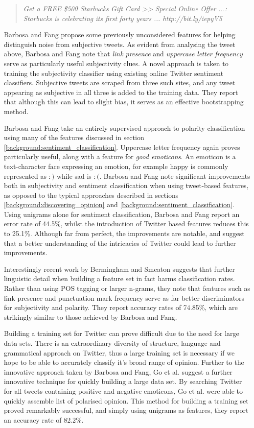 \begin{quote}
	\emph{Get a FREE \$500 Starbucks Gift Card >> Special Online Offer ...: Starbucks is celebrating its first forty years ... http://bit.ly/iepyV5}
\end{quote}

Barbosa and Fang propose some previously unconsidered features for helping distinguish noise from subjective tweets. As evident from analysing the tweet above, Barbosa and Fang note that \emph{link presence} and \emph{uppercase letter frequency} serve as particularly useful subjectivity clues. A novel approach is taken to training the subjectivity classifier using existing online Twitter sentiment classifiers. Subjective tweets are scraped from three such sites, and any tweet appearing as subjective in all three is added to the training data. They report that although this can lead to slight bias, it serves as an effective bootstrapping method. 

Barbosa and Fang take an entirely supervised approach to polarity classification using many of the features discussed in section \ref{background:sentiment_classification}. Uppercase letter frequency again proves particularly useful, along with a feature for \emph{good emoticons}. An emoticon is a text-character face expressing an emotion, for example happy is commonly represented as $:)$ while sad is $:($. Barbosa and Fang note significant improvements both in subjectivity and sentiment classification when using tweet-based features, as opposed to the typical approaches described in sections \ref{background:discovering_opinion} and \ref{background:sentiment_classification}. Using unigrams alone for sentiment classification, Barbosa and Fang report an error rate of 44.5\%, whilst the introduction of Twitter based features reduces this to 25.1\%. Although far from perfect, the improvements are notable, and suggest that a better understanding of the intricacies of Twitter could lead to further improvements.

Interestingly recent work by Bermingham and Smeaton \cite{Bermingham:2010vh} suggests that further linguistic detail when building a feature set in fact harms classification rates. Rather than using POS tagging or larger n-grams, they note that features such as link presence and punctuation mark frequency serve as far better discriminators for subjectivity and polarity. They report accuracy rates of 74.85\%, which are strikingly similar to those achieved by Barbosa and Fang. 

Building a training set for Twitter can prove difficult due to the need for large data sets. There is an extraordinary diversity of structure, language and grammatical approach on Twitter, thus a large training set is necessary if we hope to be able to accurately classify it's broad range of opinion. Further to the innovative approach taken by Barbosa and Fang, Go et al. \cite{Go:2009ut} suggest a further innovative technique for quickly building a large data set. By searching Twitter for all tweets containing positive and negative emoticons, Go et al. were able to quickly assemble list of polarised opinion. This method for building a training set proved remarkably successful, and simply using unigrams as features, they report an accuracy rate of 82.2\%. 


